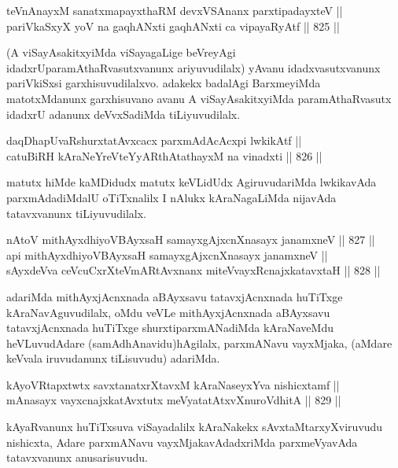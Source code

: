 \begin{shl}
teVnAnayxM sanatxmapayxthaRM devxVSAnanx parxtipadayxteV || \\
pariVkaSxyX yoV na gaqhANxti gaqhANxti ca vipayaRyAtf \hfill || 825 ||  
\end{shl}

\begin{artha}
(A viSayAsakitxyiMda viSayagaLige beVreyAgi idadxrU\break paramAthaRvasutxvanunx ariyuvudilalx) yAvanu idadxvasutxvanunx pariVkiSxsi garxhisuvudilalxvo. adakekx badalAgi BarxmeyiMda matotxMdanunx garxhisuvano avanu A viSayAsakitxyiMda paramAthaRvasutx idadxrU adanunx deVvxSadiMda tiLiyuvudilalx.
\end{artha}

\begin{shl}
daqDhapUvaRshurxtatAvxcacx parxmAdAcAcxpi lwkikAtf || \\
catuBiRH kAraNeYreVteYyARthAtathayxM na vinadxti \hfill || 826 ||  
\end{shl}

\begin{artha}
matutx hiMde kaMDidudx matutx keVLidUdx AgiruvudariMda lwkikavAda parxmAdadiMdalU oTiTxnalilx I nAlukx kAraNagaLiMda nijavAda tatavxvanunx tiLiyuvudilalx.
\end{artha}

\begin{shl}
nAtoV mithAyxdhiyoV\s BAyxsaH samayxgAjxcnXnasayx janamxneV \hfill || 827 ||  \\
api mithAyxdhiyoV\s BAyxsaH samayxgAjxcnXnasayx janamxneV || \\
sAyxdeVva ceVcuCxrXteVmARtAvxnanx miteVvayxRcnajxkatavxtaH \hfill || 828 ||  
\end{shl}

\begin{artha}
adariMda mithAyxjAcnxnada aBAyxsavu tatavxjAcnxnada huTiTxge kAraNavAguvudilalx, oMdu veVLe mithAyxjAcnxnada aBAyxsavu tatavxjAcnxnada huTiTxge shurxtiparxmANadiMda kAraNaveMdu heVLuvudAdare (samAdhAnavidu)\ndash  hAgilalx, parxmANavu vayxMjaka, (aMdare keVvala iruvudanunx tiLisuvudu) adariMda.
\end{artha}

\begin{shl}
kAyoVRtapxtwtx savxtanatxrXtavxM kAraNaseyxYva nishicxtamf || \\
mAnasayx vayxcnajxkatAvxtutx meVyatatAtxvXnuroVdhitA \hfill || 829 ||  
\end{shl}

\begin{artha}
kAyaRvanunx huTiTxsuva viSayadalilx kAraNakekx sAvxtaMtarxyXviruvudu nishicxta, Adare parxmANavu vayxMjakavAdadxriMda parxmeVyavAda tatavxvanunx anusarisuvudu.
\end{artha}

